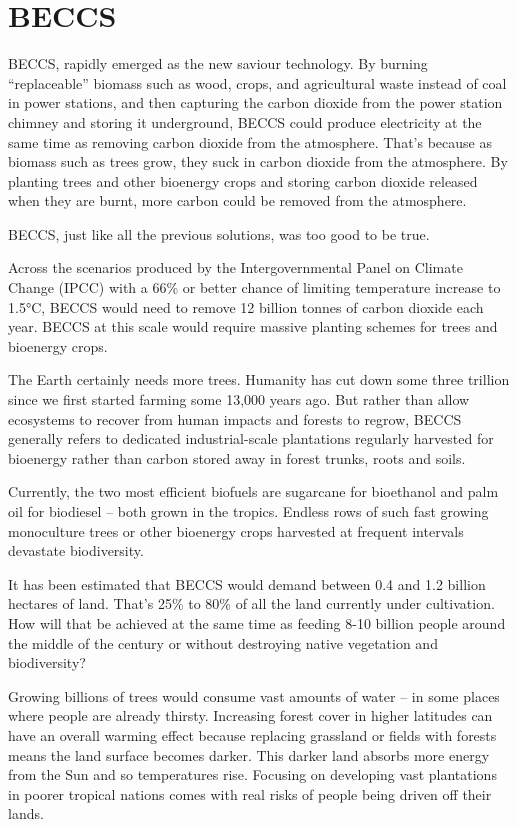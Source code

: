\documentclass[
]{book}
\begin{document}
\hypertarget{beccs}{%
\section{BECCS}\label{beccs}}

BECCS, rapidly emerged as the new saviour technology. By burning ``replaceable'' biomass such as wood, crops, and agricultural waste instead of coal in power stations, and then capturing the carbon dioxide from the power station chimney and storing it underground, BECCS could produce electricity at the same time as removing carbon dioxide from the atmosphere. That's because as biomass such as trees grow, they suck in carbon dioxide from the atmosphere. By planting trees and other bioenergy crops and storing carbon dioxide released when they are burnt, more carbon could be removed from the atmosphere.

BECCS, just like all the previous solutions, was too good to be true.

Across the scenarios produced by the Intergovernmental Panel on Climate Change (IPCC) with a 66\% or better chance of limiting temperature increase to 1.5°C, BECCS would need to remove 12 billion tonnes of carbon dioxide each year. BECCS at this scale would require massive planting schemes for trees and bioenergy crops.

The Earth certainly needs more trees. Humanity has cut down some three trillion since we first started farming some 13,000 years ago. But rather than allow ecosystems to recover from human impacts and forests to regrow, BECCS generally refers to dedicated industrial-scale plantations regularly harvested for bioenergy rather than carbon stored away in forest trunks, roots and soils.

Currently, the two most efficient biofuels are sugarcane for bioethanol and palm oil for biodiesel -- both grown in the tropics. Endless rows of such fast growing monoculture trees or other bioenergy crops harvested at frequent intervals devastate biodiversity.

It has been estimated that BECCS would demand between 0.4 and 1.2 billion hectares of land. That's 25\% to 80\% of all the land currently under cultivation. How will that be achieved at the same time as feeding 8-10 billion people around the middle of the century or without destroying native vegetation and biodiversity?

Growing billions of trees would consume vast amounts of water -- in some places where people are already thirsty. Increasing forest cover in higher latitudes can have an overall warming effect because replacing grassland or fields with forests means the land surface becomes darker. This darker land absorbs more energy from the Sun and so temperatures rise. Focusing on developing vast plantations in poorer tropical nations comes with real risks of people being driven off their lands.
\end{document}
